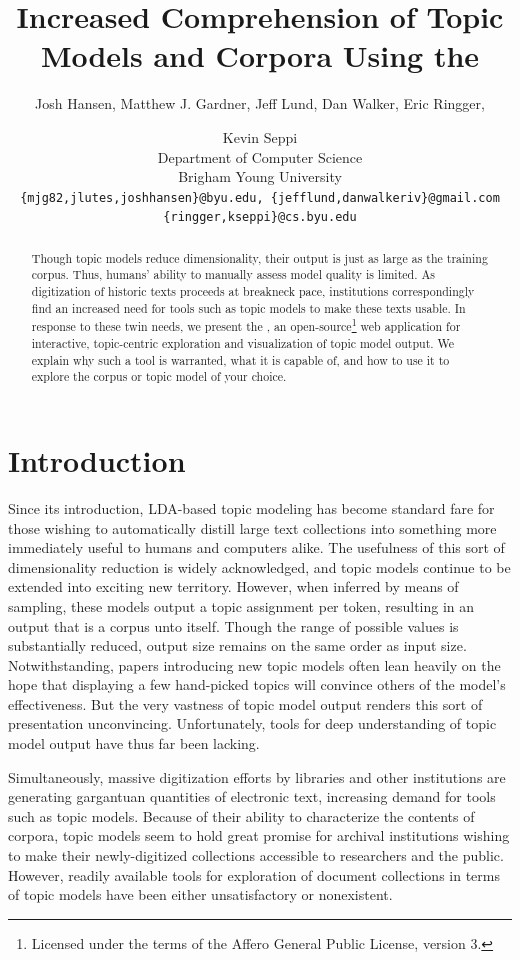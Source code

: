 \documentclass[11pt]{article}
\title{Increased Comprehension of Topic Models and Corpora Using the \tool}
\author{Josh Hansen, Matthew J. Gardner, Jeff Lund, Dan Walker, Eric Ringger, \and Kevin Seppi\\
Department of Computer Science\\
Brigham Young University\\
\tt \{mjg82,jlutes,joshhansen\}@byu.edu, \{jefflund,danwalkeriv\}@gmail.com\\
\tt \{ringger,kseppi\}@cs.byu.edu}
\begin{document}
\maketitle

\begin{abstract}
Though topic models reduce dimensionality, their output is just as large as the
training corpus. Thus, humans' ability to manually assess model quality is
limited. As digitization of historic texts proceeds at breakneck pace,
institutions correspondingly find an increased need for tools such as topic
models to make these texts usable. In response to these twin needs, we present
the \tool, an open-source\footnote{Licensed under the terms of the Affero
General Public License, version 3.} web application for interactive,
topic-centric exploration and visualization of topic model output. We explain
why such a tool is warranted, what it is capable of, and how to use it to
explore the corpus or topic model of your choice.
\end{abstract}

\section{Introduction}
Since its introduction, LDA-based topic modeling \cite{blei_latent_2003} has
become standard fare for those wishing to automatically distill large text
collections into something more immediately useful to humans and computers
alike. The usefulness of this sort of dimensionality reduction is widely
acknowledged, and topic models continue to be extended into exciting new
territory.
\cite{wang_continuous_2008,mimno_polylingual_2009,boyd-graber_holistic_2010,brody_unsupervised_2010,he_detecting_2009,yao_efficient_2009}
However, when inferred by means of sampling, these models output a topic
assignment per token, resulting in an output that is a corpus unto itself.
Though the range of possible values is substantially reduced, output size
remains on the same order as input size. Notwithstanding, papers introducing new
topic models often lean heavily on the hope that displaying a few hand-picked
topics will convince others of the model's effectiveness. But the very vastness
of topic model output renders this sort of presentation unconvincing.
Unfortunately, tools for deep understanding of topic model output have thus far
been lacking.

Simultaneously, massive digitization efforts by libraries and other institutions
are generating gargantuan quantities of electronic text, increasing demand for tools such as
topic models. Because of their ability to characterize the contents of
corpora, topic models seem to hold great promise for archival
institutions wishing to make their newly-digitized collections accessible to
researchers and the public. However, readily available tools for exploration of 
document collections in terms of topic models have been either unsatisfactory
or nonexistent.
\end{document}
